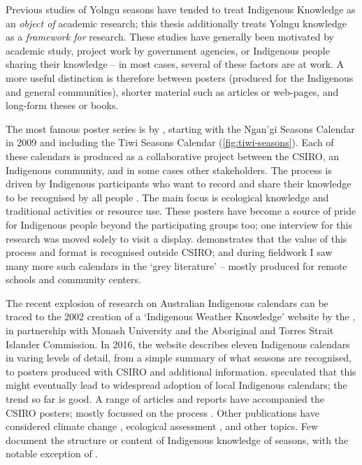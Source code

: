 Previous studies of Yolngu seasons have tended to treat Indigenous Knowledge
as an \emph{object of} academic research; this thesis additionally treats
Yolngu knowledge as a \emph{framework for} research.  These studies have generally
been motivated by academic study, project work by government agencies, or
Indigenous people sharing their knowledge -- in most cases, several of these
factors are at work.  A more useful distinction is therefore between posters
(produced for the Indigenous and general communities), shorter material such
as articles or web-pages, and long-form theses or books.

The most famous poster series is by \citet{CSIROcals}, starting with the
Ngan'gi Seasons Calendar in 2009 and including the Tiwi Seasons Calendar
(\cref{fig:tiwi-seasons}).  Each of these calendars is produced as a
collaborative project between the CSIRO, an Indigenous community, and in some
cases other stakeholders.  The process is driven by Indigenous participants
who want to record and share their knowledge to be recognised by all people
\citep{woodward2010,oconnor2010}.  The main focus is ecological knowledge and
traditional activities or resource use.  These posters have become a source of
pride for Indigenous people beyond the participating groups too; one interview
for this research was moved solely to visit a display.  \citet{gotha2012}
demonstrates that the value of this process and format is recognised outside
CSIRO; and during fieldwork I saw many more such calendars in the `grey
literature' -- mostly produced for remote schools and community centers.


The recent explosion of research on Australian Indigenous calendars can be
traced to the 2002 creation of a `Indigenous Weather Knowledge' website by the
\citet{BOM-iwk}, in partnership with Monash University and the Aboriginal and
Torres Strait Islander Commission.  In 2016, the website describes eleven
Indigenous calendars in varing levels of detail, from a simple summary of what
seasons are recognised, to posters produced with CSIRO and additional
information.  \citet{kingsley2003} speculated that this might eventually lead
to widespread adoption of local Indigenous calendars; the trend so far is good.
%
A range of articles and reports have accompanied the CSIRO posters; mostly
focussed on the process \citep[eg.][]{woodward2010,oconnor2010}.  Other
publications have considered climate change \citep[eg.][]{green2010a,green2010b},
ecological assessment \citep[eg.][]{ens2012,prober2011}, and other topics.
Few document the structure or content of Indigenous knowledge of seasons, with
the notable exception of \citet[eg.][]{woodward2012b}.


